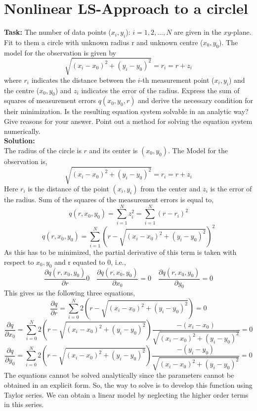 \section{Nonlinear LS-Approach to a circlel }
\noindent \textbf{Task:} The number of data points ($x_i,y_i$): $i = 1,2,...,N$ are given in the $xy$-plane. Fit to them a circle with unknown radius r and unknown centre ($x_0, y_0$). The model for the observation is given by
$$ \sqrt{(x_i - x_0)^2 + (y_i - y_0)^2} = r_i = r + z_i $$
\noindent where $r_i$ indicates the distance between the $i$-th measurement point ($x_i, y_i$) and the centre ($x_0, y_0$) and $z_i$ indicates the error of the radius. Express the sum of squares of measurement errors $q(x_0, y_0, r)$ and derive the necessary condition for their minimization. Is the resulting equation system solvable in an analytic way? Give reasons for your answer. Point out a method for solving the equation system numerically.
\\
\noindent \textbf{Solution:}\\
\noindent The radius of the circle is $r$ and its center is $(x_0,y_0)$. The Model for the observation is,
$$ \sqrt{(x_i - x_0)^2 + (y_i - y_0)^2} = r_i = r + z_i $$
\noindent Here $r_i$ is the distance of the point $(x_i,y_i)$ from the center and $z_i$ is the error of the radius. Sum of the squares of the measurement errors is equal to,
$$q(r,x_0,y_0) = \sum_{i=1}^Nz_i^2 = \sum_{i=1}^N(r-r_i)^2$$
$$q(r,x_0,y_0) = \sum_{i=1}^N(r-\sqrt{(x_i-x_0)^2+(y_i-y_0)^2})^2$$
\noindent As this has to be minimized, the partial derivative of this term is taken with respect to $x_0,y_0$ and r equated to 0, i.e.,
$$\frac{\partial q(r,x_0,y_0)}{\partial r} 0  \quad \frac{\partial q(r,x_0,y_0)}{\partial x_0} = 0 \quad \frac{\partial q(r,x_0,y_0)}{\partial y_0} = 0$$
\noindent This gives us the following three equations,
$$\frac{\partial q}{\partial r} = \sum_{i=0}^N2(r-\sqrt{(x_i-x_0)^2+(y_i-y_0)^2})=0$$
$$\frac{\partial q}{\partial x_0} = \sum_{i=0}^N2(r-\sqrt{(x_i-x_0)^2+(y_i-y_0)^2})\frac{-(x_i-x_0)}{\sqrt{(x_i-x_0)^2+(y_i-y_0)^2}}=0$$
$$\frac{\partial q}{\partial y_0} = \sum_{i=0}^N2(r-\sqrt{(x_i-x_0)^2+(y_i-y_0)^2})\frac{-(y_i-y_0)}{\sqrt{(x_i-x_0)^2+(y_i-y_0)^2}}=0$$
\noindent The equations cannot be solved analytically since the parameters cannot be obtained in an explicit form. So, the way to solve is to develop this function using Taylor series. We can obtain a linear model by neglecting the higher order terms in this series.

